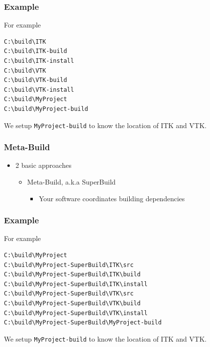 \subsubsection{Example}\label{example-3}

For example

\begin{verbatim}
C:\build\ITK
C:\build\ITK-build
C:\build\ITK-install
C:\build\VTK
C:\build\VTK-build
C:\build\VTK-install
C:\build\MyProject
C:\build\MyProject-build
\end{verbatim}

We setup \texttt{MyProject-build} to know the location of ITK and VTK.

\subsubsection{Meta-Build}\label{meta-build}

\begin{itemize}
\itemsep1pt\parskip0pt
\item
  2 basic approaches

  \begin{itemize}
  \itemsep1pt\parskip0pt
  \item
    Meta-Build, a.k.a SuperBuild

    \begin{itemize}
    \itemsep1pt\parskip0pt
    \item
      Your software coordinates building dependencies
    \end{itemize}
  \end{itemize}
\end{itemize}

\subsubsection{Example}\label{example-4}

For example

\begin{verbatim}
C:\build\MyProject
C:\build\MyProject-SuperBuild\ITK\src
C:\build\MyProject-SuperBuild\ITK\build
C:\build\MyProject-SuperBuild\ITK\install
C:\build\MyProject-SuperBuild\VTK\src
C:\build\MyProject-SuperBuild\VTK\build
C:\build\MyProject-SuperBuild\VTK\install
C:\build\MyProject-SuperBuild\MyProject-build
\end{verbatim}

We setup \texttt{MyProject-build} to know the location of ITK and VTK.

